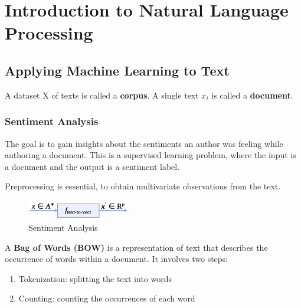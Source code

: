 
\chapter{Introduction to Natural Language Processing}

\section{Applying Machine Learning to Text}


A dataset X of texts is called a \textbf{corpus}. A single text $x_i$ is called a \textbf{document}.

\subsection{Sentiment Analysis}

The goal is to gain insights about the sentiments an author was feeling while authoring a document.
This is a supervised learning problem, where the input is a document and the output is a sentiment label.

Preprocessing is essential, to obtain multivariate observations from the text. 

\begin{center}
    \begin{figure}[H]
        \centering
        \includegraphics[width=0.4\textwidth]{assets/fig39.png}
        \caption{Sentiment Analysis}
    \end{figure}
\end{center}

A \textbf{Bag of Words (BOW)} is a representation of text that describes the occurrence of words within a document. It involves two steps:
\begin{enumerate}
    \item Tokenization: splitting the text into words
    \item Counting: counting the occurrences of each word
\end{enumerate}

